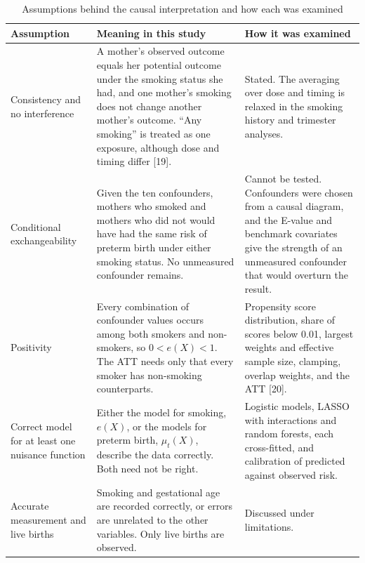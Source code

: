 \documentclass[11pt,letterpaper]{article}
\begin{document}
\begin{table}[htbp]
\centering
\caption{Assumptions behind the causal interpretation and how each was examined}\label{tab:assump}
\small
\begin{tabular}{>{\raggedright\arraybackslash}p{3.0cm}>{\raggedright\arraybackslash}p{6.4cm}>{\raggedright\arraybackslash}p{5.6cm}}
\toprule
Assumption & Meaning in this study & How it was examined \\
\midrule
Consistency and no interference & A mother's observed outcome equals her potential outcome under the smoking status she had, and one mother's smoking does not change another mother's outcome. \textquotedblleft Any smoking\textquotedblright{} is treated as one exposure, although dose and timing differ [19]. & Stated. The averaging over dose and timing is relaxed in the smoking history and trimester analyses. \\[4pt]
Conditional exchangeability & Given the ten confounders, mothers who smoked and mothers who did not would have had the same risk of preterm birth under either smoking status. No unmeasured confounder remains. & Cannot be tested. Confounders were chosen from a causal diagram, and the E-value and benchmark covariates give the strength of an unmeasured confounder that would overturn the result. \\[4pt]
Positivity & Every combination of confounder values occurs among both smokers and non-smokers, so $0<e(X)<1$. The ATT needs only that every smoker has non-smoking counterparts. & Propensity score distribution, share of scores below 0.01, largest weights and effective sample size, clamping, overlap weights, and the ATT [20]. \\[4pt]
Correct model for at least one nuisance function & Either the model for smoking, $e(X)$, or the models for preterm birth, $\mu_t(X)$, describe the data correctly. Both need not be right. & Logistic models, LASSO with interactions and random forests, each cross-fitted, and calibration of predicted against observed risk. \\[4pt]
Accurate measurement and live births & Smoking and gestational age are recorded correctly, or errors are unrelated to the other variables. Only live births are observed. & Discussed under limitations. \\
\bottomrule
\end{tabular}
\end{table}
\end{document}
